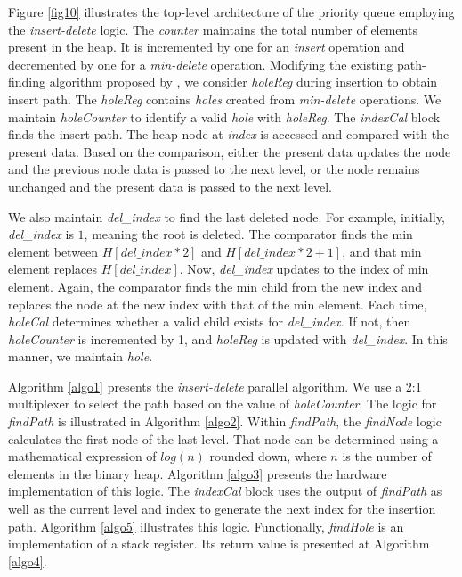 \documentclass[10pt, conference, compsocconf]{IEEEtran}
\begin{document}
Figure \ref{fig10} illustrates the top-level architecture of the priority queue employing the {\it insert-delete} logic.
The {\it counter} maintains the total number of elements present in the heap.
It is incremented by one for an {\it insert} operation and decremented by one for a {\it min-delete} operation.
Modifying the existing path-finding algorithm proposed by \cite{pq6}, we consider {\it holeReg} during insertion to obtain insert path.
The {\it holeReg} contains {\it holes} created from {\it min-delete} operations.
We maintain {\it holeCounter} to identify a valid {\it hole} with {\it holeReg}.
The {\it indexCal} block finds the insert path.
The heap node at {\it index} is accessed and compared with the present data.
Based on the comparison, either the present data updates the node and the previous node data is passed to the next level, or the node remains unchanged and the present data is passed to the next level.

We also maintain {\it del\_index} to find the last deleted node.
For example, initially, {\it del\_index} is $1$, meaning the root is deleted.
The comparator finds the min element between $H[del\_index*2]$ and $H[del\_index*2 + 1]$, and that min element replaces $H[del\_index]$.
Now, {\it del\_index} updates to the index of min element.
Again, the comparator finds the min child from the new index and replaces the node at the new index with that of the min element.
Each time, {\it holeCal} determines whether a valid child exists for {\it del\_index}.
If not, then {\it holeCounter} is incremented by 1, and {\it holeReg} is updated with {\it del\_index}. 
In this manner, we maintain {\it hole}.

Algorithm \ref{algo1} presents the {\it insert-delete} parallel algorithm.
We use a 2:1 multiplexer to select the path based on the value of {\it holeCounter}.
The logic for {\it findPath} is illustrated in Algorithm \ref{algo2}.
Within {\it findPath}, the {\it findNode} logic calculates the first node of the last level.
That node can be determined using a mathematical expression of $log(n)$ rounded down, where $n$ is the number of elements in the binary heap.
Algorithm \ref{algo3} presents the hardware implementation of this logic.
The {\it indexCal} block uses the output of {\it findPath} as well as the current level and index to generate the next index for the insertion path. Algorithm \ref{algo5} illustrates this logic.
Functionally, {\it findHole} is an implementation of a stack register. Its return value is presented at Algorithm \ref{algo4}.
\end{document}
